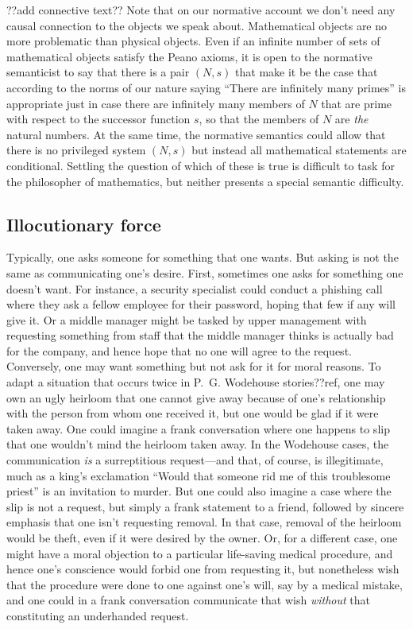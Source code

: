 ??add connective text??
Note that on our normative account we don't need any causal connection to the objects we speak about. Mathematical objects
are no more problematic than physical objects. Even if an infinite number of sets of mathematical objects satisfy the Peano axioms, it is open 
to the normative semanticist to say that there is a pair $(N,s)$ that make it be the case that according to the norms of our nature
saying ``There are infinitely many primes'' is appropriate just in case there are infinitely many members of $N$ that are prime
with respect to the successor function $s$, so that the members of $N$ are \textit{the} natural numbers. At the same time, the
normative semantics could allow that there is no privileged system $(N,s)$ but instead all mathematical statements are conditional.
Settling the question of which of these is true is difficult to task for the philosopher of mathematics, but neither presents a 
special semantic difficulty.

\subsection{Illocutionary force}
Typically, one asks someone for something that one wants. But asking is not the same as communicating one's desire. First,
sometimes one asks for something one doesn't want. For instance, a security specialist could conduct a phishing call where they
ask a fellow employee for their password, hoping that few if any will give it. Or a middle manager might be tasked by upper
management with requesting something from staff that the middle manager thinks is actually bad for the company, and hence hope
that no one will agree to the request. Conversely, one may want something but not ask for it for moral reasons. To adapt a 
situation that occurs twice in P.~G. Wodehouse stories??ref, one may own an ugly heirloom that one cannot give away because 
of one's relationship with the person from whom one received it, but one would be glad if it were taken away. One could imagine
a frank conversation where one happens to slip that one wouldn't mind the heirloom taken away. In the Wodehouse
cases, the communication \textit{is} a surreptitious request---and that, of course, is illegitimate, much as a king's
exclamation ``Would that someone rid me of this troublesome priest'' is an invitation to murder. But one could also imagine
a case where the slip is not a request, but simply a frank statement to a friend, followed by sincere emphasis that one isn't
requesting removal. In that case, removal of the heirloom would be theft, even if it were desired by the owner. Or, for a
different case, one might have a moral objection to a particular life-saving medical procedure, and hence one's conscience would
forbid one from requesting it, but nonetheless wish that the procedure were done to one against one's will, say by a medical
mistake, and one could in a frank conversation communicate that wish \textit{without} that constituting an underhanded request.

